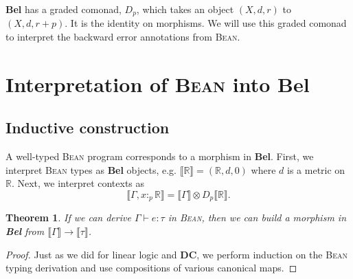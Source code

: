 \documentclass[a4paper]{article}
\newcommand{\DC}{\textbf{DC}}
\newcommand{\Bel}{\textbf{Bel}}
\newcommand{\Bean}{\textsc{Bean}}
\newcommand{\denot}[1]{\llbracket {#1} \rrbracket}
\newcommand{\R}{\mathbb{R}}
\newtheorem{theorem}{Theorem}
\begin{document}
\Bel{} has a graded comonad, $D_p$, which takes an object $(X,d,r)$ to $(X,d,r+p)$. It is the identity on morphisms. We will use this graded comonad to interpret the backward error annotations from \Bean{}.

\section{Interpretation of \Bean{} into \Bel{}}
\subsection{Inductive construction}
A well-typed \Bean{} program corresponds to a morphism in \Bel{}. First, we interpret \Bean{} types as \Bel{} objects, e.g. $\denot{\R}=(\R,d,0)$ where $d$ is a metric on $\R$. Next, we interpret contexts as 
\begin{equation*}
    \denot{\Gamma,x:_p\R}=\denot\Gamma\otimes D_p\denot\R.
\end{equation*}

\begin{theorem}
    If we can derive $\Gamma\vdash e:\tau$ in \Bean{}, then we can build a morphism in \Bel{} from $\denot\Gamma\to\denot\tau$.
\end{theorem} 
\begin{proof}
    Just as we did for linear logic and \DC{}, we perform induction on the \Bean{} typing derivation and use compositions of various canonical maps. 
\end{proof}
\end{document}

